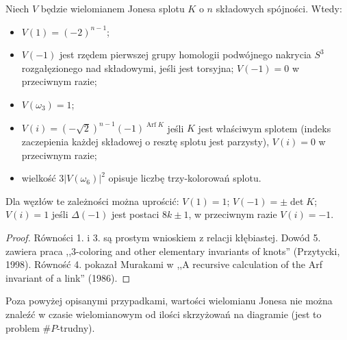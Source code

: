 \begin{proposition} \label{jones_sharp_p_hard}
	Niech $V$ będzie wielomianem Jonesa splotu $K$ o $n$ składowych spójności.
	Wtedy:
	\begin{itemize}
		\item $V(1) = (-2)^{n-1}$;
		\item $V(-1)$ jest rzędem pierwszej grupy homologii podwójnego nakrycia $S^3$ rozgałęzionego nad składowymi, jeśli jest torsyjna; $V(-1) = 0$ w przeciwnym razie;
		\item $V(\omega_3) = 1$;
		\item $V(i) = (-\sqrt 2)^{n-1}(-1)^{\operatorname{Arf} K}$ jeśli $K$ jest właściwym splotem (indeks zaczepienia każdej składowej o resztę splotu jest parzysty), $V(i) = 0$ w przeciwnym razie;
		\item wielkość $3|V(\omega_6)|^2$ opisuje liczbę trzy-kolorowań splotu.
	\end{itemize}
	Dla węzłów te zależności można uprościć: $V(1) = 1$; $V(-1) = \pm \det K$; $V(i) = 1$ jeśli $\Delta(-1)$ jest postaci $8k \pm 1$, w przeciwnym razie $V(i) = -1$.
\end{proposition}

\begin{proof}
	Równości 1. i 3. są prostym wnioskiem z relacji kłębiastej.
	Dowód 5. zawiera praca ,,3-coloring and other elementary invariants of knots'' (Przytycki, 1998).
	Równość 4. pokazał Murakami w ,,A recursive calculation of the Arf invariant of a link'' (1986).
\end{proof}

Poza powyżej opisanymi przypadkami, wartości wielomianu Jonesa nie można znaleźć w czasie wielomianowym od ilości skrzyżowań na diagramie (jest to problem $\#P$-trudny).

